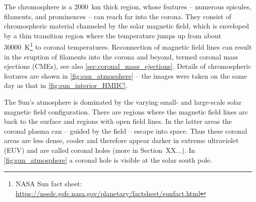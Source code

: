 The chromosphere is a \SI{2000}{\km} thick region, whose features -- numerous spicules, filaments, and prominences -- can reach far into the corona. They consist of chromospheric material channeled by the solar magnetic field, which is enveloped by a thin transition region where the temperature jumps up from about \SI{30000}{\K}\footnote{NASA Sun fact sheet: \url{https://nssdc.gsfc.nasa.gov/planetary/factsheet/sunfact.html}} to coronal temperatures. Reconnection of magnetic field lines can result in the eruption of filaments into the corona and beyond, termed coronal mass ejections (CMEs), see also \autoref{sec:coronal_mass_ejections}. Details of chromospheric features are shown in \autoref{fig:sun_atmosphere} -- the images were taken on the same day as that in \autoref{fig:sun_interior_HMIIC}.
\begin{figure}[htb]
\end{figure}

The Sun's atmosphere is dominated by the varying small- and large-scale solar magnetic field configuration. There are regions where the magnetic field lines arc back to the surface and regions with open field lines. In the latter areas the coronal plasma can -- guided by the field -- escape into space. Thus these coronal areas are less dense, cooler and therefore appear darker in extreme ultraviolet (EUV) and are called coronal holes (more in Section~XX...). In \autoref{fig:sun_atmosphere} a coronal hole is visible at the solar south pole.

